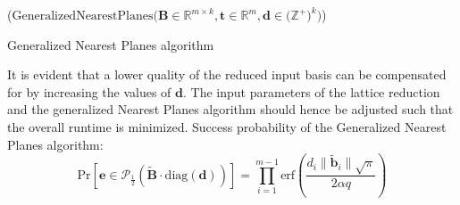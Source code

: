 \begin{algorithm2e}
  \Begin($\text{GeneralizedNearestPlanes} {(} \mathbf{B} \in \mathbb{R}^{m \times k},\mathbf{t} \in \mathbb{R}^{m}, \mathbf{d} \in {(}\mathbb{Z}^+{)}^k {)}$)
    { %
  }
  \caption{Generalized Nearest Planes algorithm \cite{LP11}}\label{alg:GeneralizedNearestPlanes}
\end{algorithm2e}

It is evident that a lower quality of the reduced input basis can be compensated for by increasing the values of $\mathbf{d}$. The input parameters of the lattice reduction and the generalized Nearest Planes algorithm should hence be adjusted such that the overall runtime is minimized. %
Success probability of the Generalized Nearest Planes algorithm:
\begin{equation}
  \text{Pr}\left[ \mathbf{e} \in \mathcal{P}_{\frac{1}{2}}(\tilde{\mathbf{B}} \cdot \text{diag}(\mathbf{d}))\right] = \prod_{i=1}^{m-1} \text{erf}\left(\frac{d_i \|\tilde{\mathbf{b}}_i\| \sqrt{\pi}}{2\alpha q}\right)
\end{equation} %







